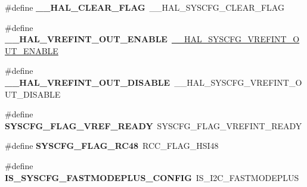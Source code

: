 \begin{DoxyCompactItemize}
\item 
\hypertarget{group___h_a_l___aliased___macros_ga5c6118ac714daf269dfcf8b0dc5740cf}{\#define {\bfseries \-\_\-\-\_\-\-H\-A\-L\-\_\-\-C\-L\-E\-A\-R\-\_\-\-F\-L\-A\-G}~\-\_\-\-\_\-\-H\-A\-L\-\_\-\-S\-Y\-S\-C\-F\-G\-\_\-\-C\-L\-E\-A\-R\-\_\-\-F\-L\-A\-G}\label{group___h_a_l___aliased___macros_ga5c6118ac714daf269dfcf8b0dc5740cf}

\item 
\hypertarget{group___h_a_l___aliased___macros_gac1dfd2bab2879b5106f1dc496e3c356c}{\#define {\bfseries \-\_\-\-\_\-\-H\-A\-L\-\_\-\-V\-R\-E\-F\-I\-N\-T\-\_\-\-O\-U\-T\-\_\-\-E\-N\-A\-B\-L\-E}~\hyperlink{group___s_y_s_c_f_g___vref_int_gaaf7a83b4563a6dc56f6ffcf4b5a4d3ab}{\-\_\-\-\_\-\-H\-A\-L\-\_\-\-S\-Y\-S\-C\-F\-G\-\_\-\-V\-R\-E\-F\-I\-N\-T\-\_\-\-O\-U\-T\-\_\-\-E\-N\-A\-B\-L\-E}}\label{group___h_a_l___aliased___macros_gac1dfd2bab2879b5106f1dc496e3c356c}

\item 
\hypertarget{group___h_a_l___aliased___macros_ga8ef2904e9bea234864ed664771aeed49}{\#define {\bfseries \-\_\-\-\_\-\-H\-A\-L\-\_\-\-V\-R\-E\-F\-I\-N\-T\-\_\-\-O\-U\-T\-\_\-\-D\-I\-S\-A\-B\-L\-E}~\-\_\-\-\_\-\-H\-A\-L\-\_\-\-S\-Y\-S\-C\-F\-G\-\_\-\-V\-R\-E\-F\-I\-N\-T\-\_\-\-O\-U\-T\-\_\-\-D\-I\-S\-A\-B\-L\-E}\label{group___h_a_l___aliased___macros_ga8ef2904e9bea234864ed664771aeed49}

\item 
\hypertarget{group___h_a_l___aliased___macros_ga2978f132138676255e533e6f18fbe5df}{\#define {\bfseries S\-Y\-S\-C\-F\-G\-\_\-\-F\-L\-A\-G\-\_\-\-V\-R\-E\-F\-\_\-\-R\-E\-A\-D\-Y}~S\-Y\-S\-C\-F\-G\-\_\-\-F\-L\-A\-G\-\_\-\-V\-R\-E\-F\-I\-N\-T\-\_\-\-R\-E\-A\-D\-Y}\label{group___h_a_l___aliased___macros_ga2978f132138676255e533e6f18fbe5df}

\item 
\hypertarget{group___h_a_l___aliased___macros_gaaf8b670b9f5fdd39553af1637189456c}{\#define {\bfseries S\-Y\-S\-C\-F\-G\-\_\-\-F\-L\-A\-G\-\_\-\-R\-C48}~R\-C\-C\-\_\-\-F\-L\-A\-G\-\_\-\-H\-S\-I48}\label{group___h_a_l___aliased___macros_gaaf8b670b9f5fdd39553af1637189456c}

\item 
\hypertarget{group___h_a_l___aliased___macros_ga57549e7341a90913bac75a34768b9562}{\#define {\bfseries I\-S\-\_\-\-S\-Y\-S\-C\-F\-G\-\_\-\-F\-A\-S\-T\-M\-O\-D\-E\-P\-L\-U\-S\-\_\-\-C\-O\-N\-F\-I\-G}~I\-S\-\_\-\-I2\-C\-\_\-\-F\-A\-S\-T\-M\-O\-D\-E\-P\-L\-U\-S}\label{group___h_a_l___aliased___macros_ga57549e7341a90913bac75a34768b9562}


\end{DoxyCompactItemize}
